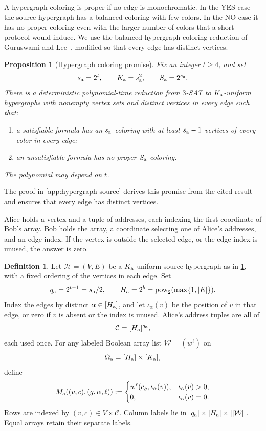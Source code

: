 \documentclass[11pt,letterpaper]{article} \usepackage[utf8]{inputenc}
\theoremstyle{plain} \newtheorem{theorem}{Theorem}[section]
\newtheorem{proposition}[proposition]{Proposition}
\theoremstyle{definition} \newaliascnt{definition}{theorem}
\newtheorem{definition}[definition]{Definition} \aliascntresetthe{definition}
\begin{document}
A hypergraph coloring is proper if no edge is monochromatic. In the YES case
the source hypergraph has a balanced coloring with few colors. In the NO case it has no
proper coloring even with the larger number of colors that a short protocol would induce. We use the balanced
hypergraph coloring reduction of Guruswami and Lee~\cite{guruswami2018balanced},
modified so that every edge has distinct vertices.

\begin{proposition}[Hypergraph coloring promise]\label{yao:source}
Fix an integer $t\ge4$, and set
\[
s_{\rm a}=2^t,\qquad K_{\rm a}=s_{\rm a}^2,\qquad S_{\rm a}=2^{s_{\rm a}}.
\]
There is a deterministic polynomial-time reduction from $3$-SAT to
$K_{\rm a}$-uniform hypergraphs with nonempty vertex sets and distinct vertices
in every edge such that:
\begin{enumerate}
\item a satisfiable formula has an $s_{\rm a}$-coloring with at least $s_{\rm a}-1$ vertices of every color in every edge;
\item an unsatisfiable formula has no proper $S_{\rm a}$-coloring.
\end{enumerate}
The polynomial may depend on $t$.
\end{proposition}

The proof in \cref{app:hypergraph-source} derives this promise from the cited
result and ensures that every edge has distinct vertices.

Alice holds a vertex and a tuple of addresses, each indexing the first
coordinate of Bob's array. Bob holds the array, a coordinate selecting one of Alice's addresses,
and an edge index. If the vertex
is outside the selected edge, or the edge index is unused, the answer is zero.

\begin{definition}\label{def:alternating-table}
Let $\mathcal H=(V,E)$ be a $K_{\rm a}$-uniform source hypergraph as in
\cref{yao:source}, with a fixed ordering of the vertices in each edge. Set
\[
q_{\rm a}=2^{t-1}=s_{\rm a}/2, \qquad H_{\rm a}=2^b=\operatorname{pow}_2(\max\{1,|E|\}).
\]
Index the
edges by distinct $\alpha\in[H_{\rm a}]$, and let $\iota_\alpha(v)$ be the
position of $v$ in that edge, or zero if $v$ is absent or the index is unused.
Alice's address tuples are all of
\[
\mathcal C=[H_{\rm a}]^{q_{\rm a}},
\]
each used once.
For any labeled Boolean array list $\mathcal W=(w^\ell)$ on
\[
\Omega_{\rm a}=[H_{\rm a}]\times[K_{\rm a}],
\]
define
\[
M_{\rm a}((v,c),(g,\alpha,\ell)):=
\begin{cases}
w^\ell(c_g,\iota_\alpha(v)),&\iota_\alpha(v)>0,\\
0,&\iota_\alpha(v)=0.
\end{cases}
\]
Rows are indexed by $(v,c)\in V\times\mathcal C$. Column labels lie in
$[q_{\rm a}]\times[H_{\rm a}]\times[|\mathcal W|]$. Equal arrays retain their
separate labels.
\end{definition}
\end{document}
